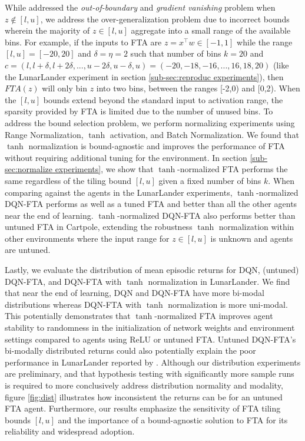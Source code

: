 \documentclass{article}
\begin{document}
While \cite{pan2019fuzzy} addressed the \textit{out-of-boundary} and \textit{gradient vanishing} problem when $z \notin [l,u]$, we address the over-generalization problem due to incorrect bounds wherein the majority of $z \in [l,u]$ aggregate into a small range of the available bins. 
For example, if the inputs to FTA are $z = x^\top w \in [-1,1]$ while the range $[l,u] = [-20,20]$ and $\delta = \eta = 2$ such that number of bins $k=20$ and $c=(l, l+\delta, l+2\delta, ..., u-2\delta, u-\delta, u) = (-20, -18, -16, ..., 16, 18, 20)$ (like the LunarLander experiment in section \ref{sub-sec:reproduc experiments}), then $FTA(z)$ will only bin $z$ into two bins, between the ranges [-2,0) and [0,2). 
When the $[l,u]$ bounds extend beyond the standard input to activation range, the sparsity provided by FTA is limited due to the number of unused bins. 
To address the bound selection problem, we perform normalizing experiments using Range Normalization, $\tanh$ activation, and Batch Normalization. 
We found that $\tanh$ normalization is bound-agnostic and improves the performance of FTA without requiring additional tuning for the environment. 
In section \ref{sub-sec:normalize experiments}, we show that $\tanh$-normalized FTA performs the same regardless of the tiling bound $[l,u]$ given a fixed number of bins $k$. 
When comparing against the agents in the LunarLander experiments, $\tanh$-normalized DQN-FTA performs as well as a tuned FTA and better than all the other agents near the end of learning. 
$\tanh$-normalized DQN-FTA also performs better than untuned FTA in Cartpole, extending the robustness $\tanh$ normalization within other environments where the input range for $z \in [l,u]$ is unknown and agents are untuned. 

Lastly, we evaluate the distribution of mean episodic returns for DQN, (untuned) DQN-FTA, and DQN-FTA with $\tanh$ normalization in LunarLander. 
We find that near the end of learning, DQN and DQN-FTA have more bi-modal distributions whereas DQN-FTA with $\tanh$ normalization is more uni-modal. 
This potentially demonstrates that $\tanh$-normalized FTA improves agent stability to randomness in the initialization of network weights and environment settings compared to agents using ReLU or untuned FTA. 
Untuned DQN-FTA’s bi-modally distributed returns could also potentially explain the poor performance in LunarLander reported by \cite{pan2019fuzzy}. 
Although our distribution experiments are preliminary, and that hypothesis testing with significantly more sample runs is required to more conclusively address distribution normality and modality, figure \ref{fig:dist} illustrates how inconsistent the returns can be for an untuned FTA agent. 
Furthermore, our results emphasize the sensitivity of FTA tiling bounds $[l,u]$ and the importance of a bound-agnostic solution to FTA for its reliability and widespread adoption.
\end{document}
